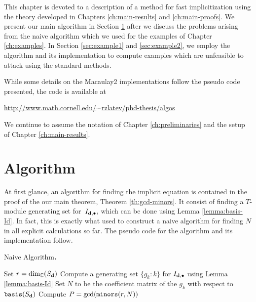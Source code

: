 \documentclass[fleqn,reqno]{amsart}
\newcounter{chapter}
\numberwithin{first}{chapter}
\begin{document}

\begin{paragraf*}
This chapter is devoted to a description of a method for fast implicitization using
the theory developed in Chapters \ref{ch:main-results} and \ref{ch:main-proofs}.
We present our main algorithm in Section \ref{sec:algorithm} after we discuss
the problems arising from the naive algorithm
which we used for the examples of Chapter \ref{ch:examples}.
In Section \ref{sec:example1} and \ref{sec:example2},
we employ the algorithm and its implementation to compute examples which are unfeasible
to attack using the standard methods.

While some details on the Macaulay2 implementations follow the pseudo code presented,
the code is available at
\begin{center}
	\href{http://www.math.cornell.edu/~rzlatev/phd-thesis/algos}{\ttten http://www.math.cornell.edu/$\sim$rzlatev/phd-thesis/algos}
\end{center}
\end{paragraf*}

\begin{paragraf*}
We continue to assume the notation of Chapter \ref{ch:preliminaries}
and the setup of Chapter \ref{ch:main-results}.
\end{paragraf*}



\section{Algorithm}
\label{sec:algorithm}

\begin{paragraf*}
At first glance, an algorithm for finding the implicit equation is contained in the proof
of the our main theorem, Theorem \ref{th:gcd-minors}.
It consist of finding a $T$-module generating set for~$I_{\mathbf d,\bullet}$,
which can be done using Lemma \ref{lemma:basis-Id}.
In fact, this is exactly what used to construct a naive algorithm for finding $N$
in all explicit calculations so far.
The pseudo code for the algorithm and its implementation follow.
\end{paragraf*}

\begin{algorithm} {\sc Naive Algorithm\bf.}
\label{algo:naive-algorithm}
\begin{algorithmic}
  \State Set $r=\dim_{\mathbb{C}}(S_{\mathbf d})$
  \State Compute a generating set $\{g_k:k\}$ for $I_{\mathbf d,\bullet}$
  	using Lemma \ref{lemma:basis-Id}
  \State Set $N$ to be the coefficient matrix of the $g_k$ with respect to $\mathop{\tt basis}(S_\mathbf d)$
  \State Compute $P=\gcd(\mathop{\tt minors}(r,N))$
\end{algorithmic}
\end{algorithm}
\end{document}
